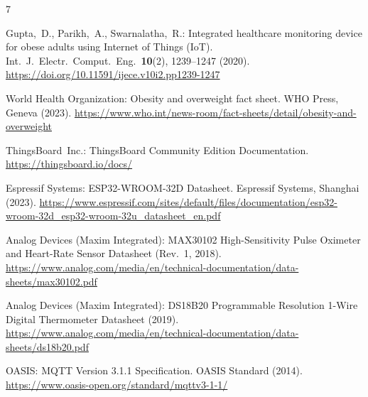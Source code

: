 \documentclass[pdflatex,sn-mathphys-num]{sn-jnl}
\begin{document}
\begin{thebibliography}{7}
\footnotesize

Gupta,~D., Parikh,~A., Swarnalatha,~R.:
Integrated healthcare monitoring device for obese adults using
Internet of Things (IoT).
Int.\ J.\ Electr.\ Comput.\ Eng.\ \textbf{10}(2), 1239--1247 (2020).
\url{https://doi.org/10.11591/ijece.v10i2.pp1239-1247}

World Health Organization: Obesity and overweight fact sheet.
WHO Press, Geneva (2023).
\url{https://www.who.int/news-room/fact-sheets/detail/obesity-and-overweight}

ThingsBoard~Inc.: ThingsBoard Community Edition Documentation.
\url{https://thingsboard.io/docs/}

Espressif Systems: ESP32-WROOM-32D Datasheet.
Espressif Systems, Shanghai (2023).
\url{https://www.espressif.com/sites/default/files/documentation/esp32-wroom-32d_esp32-wroom-32u_datasheet_en.pdf}

Analog Devices (Maxim Integrated): MAX30102 High-Sensitivity Pulse
Oximeter and Heart-Rate Sensor Datasheet (Rev.\ 1, 2018).
\url{https://www.analog.com/media/en/technical-documentation/data-sheets/max30102.pdf}

Analog Devices (Maxim Integrated): DS18B20 Programmable Resolution
1-Wire Digital Thermometer Datasheet (2019).
\url{https://www.analog.com/media/en/technical-documentation/data-sheets/ds18b20.pdf}

OASIS: MQTT Version 3.1.1 Specification. OASIS Standard (2014).
\url{https://www.oasis-open.org/standard/mqttv3-1-1/}

\end{thebibliography}
\end{document}
